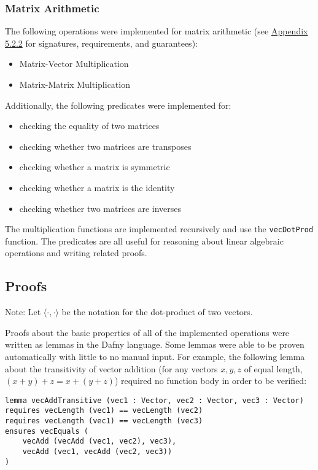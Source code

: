 \documentclass[12pt]{article}
\begin{document}
\subsubsection{Matrix Arithmetic}
The following operations were implemented for matrix arithmetic (see \hyperref[sec:matrixsigs]{Appendix 5.2.2} for signatures, requirements, and guarantees):
\begin{itemize}
\item Matrix-Vector Multiplication
\item Matrix-Matrix Multiplication
\end{itemize}

Additionally, the following predicates were implemented for:
\begin{itemize}
\item checking the equality of two matrices
\item checking whether two matrices are transposes
\item checking whether a matrix is symmetric
\item checking whether a matrix is the identity
\item checking whether two matrices are inverses
\end{itemize}

The multiplication functions are implemented recursively and use the \verb|vecDotProd| function. The predicates are all useful for reasoning about linear algebraic operations and writing related proofs.

\subsection{Proofs}
\label{sec:proofs}
Note: Let $\langle \cdot, \cdot \rangle$ be the notation for the dot-product of two vectors.

Proofs about the basic properties of all of the implemented operations were written as lemmas in the Dafny language. Some lemmas were able to be proven automatically with little to no manual input. For example, the following lemma about the transitivity of vector addition (for any vectors $x, y, z$ of equal length, $(x + y) + z = x + (y + z)$) required no function body in order to be verified:

\begin{verbatim}
lemma vecAddTransitive (vec1 : Vector, vec2 : Vector, vec3 : Vector)
requires vecLength (vec1) == vecLength (vec2)
requires vecLength (vec1) == vecLength (vec3)
ensures vecEquals (
    vecAdd (vecAdd (vec1, vec2), vec3),
    vecAdd (vec1, vecAdd (vec2, vec3))
)
\end{verbatim}
\end{document}

